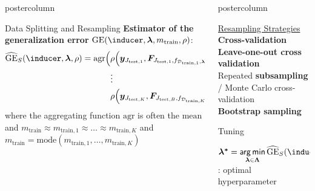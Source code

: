 \documentclass{beamer}
\newlength{\columnheight} %
\begin{document}
\begin{frame}[fragile]{}
\begin{columns}
\begin{column}{.31\textwidth}
\begin{beamercolorbox}[center]{postercolumn}
\begin{minipage}{.98\textwidth}
{\begin{myblock}{Data Splitting and Resampling}
\textbf{Estimator of the generalization error} $\mathrm{GE}(\inducer, \bm{\lambda}, m_\mathrm{train}, \rho)$:
\begin{equation*}
\begin{split}
\widehat{\mathrm{GE}}_S(\inducer, \boldsymbol\lambda, \rho) = \mathrm{agr}\Big(
 &\rho\Big(\boldsymbol{y}_{J_{\mathrm{test},1}}, \boldsymbol{F}_{J_{\mathrm{test},1},f_{\mathcal{D}_{\mathrm{train},1}, \boldsymbol\lambda}}\Big), \\ &\large{\vdots} \\
& \rho\Big(\boldsymbol{y}_{J_{\mathrm{test},K}}, \boldsymbol{F}_{J_{\mathrm{test},B},
f_{\mathcal{D}_{\mathrm{train},K}, \boldsymbol\lambda}}\Big)
    \Big),
\end{split}
\end{equation*}
where the aggregating function $\mathrm{agr}$ is often the $\textrm{mean}$ and
$m_{\mathrm{train}} \approx m_{\mathrm{train},1} \approx \dots \approx m_{\mathrm{train},K}$ and $m_{\mathrm{train}} = \mathrm{mode}(m_{\mathrm{train},1}, \dots, m_{\mathrm{train},K})$
\end{myblock}
\vfill
				}
			\end{minipage}
		\end{beamercolorbox}
	\end{column}
	\begin{column}{.31\textwidth}
		\begin{beamercolorbox}[center]{postercolumn}
			\begin{minipage}{.98\textwidth}
				\parbox[t][\columnheight]{\textwidth}{
\underline{Resampling Strategies}\\

\textbf{Cross-validation}\\ 

\textbf{Leave-one-out cross validation}\\

Repeated \textbf{subsampling} / Monte Carlo cross-validation\\ 

\textbf{Bootstrap sampling}\\ 

\begin{myblock}{Tuning}

$\boldsymbol{\lambda^*} = \argmin \limits_{\boldsymbol{\lambda} \in \bm{\Lambda}} \widehat{\mathrm{GE}}_S(\inducer, \boldsymbol\lambda, \rho)$ : optimal hyperparameter\\


\end{myblock}}
\end{minipage}
\end{beamercolorbox}
\end{column}
\end{columns}
\end{frame}
\end{document}
